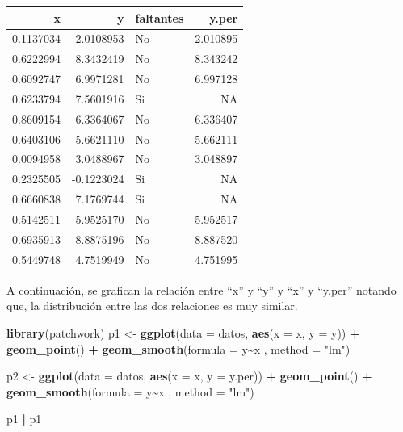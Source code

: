 \documentclass[
  spanish,
  12pt,
]{book}
\newenvironment{Shaded}{\begin{snugshade}}{\end{snugshade}}
\newcommand{\AttributeTok}[1]{\textcolor[rgb]{0.13,0.29,0.53}{#1}}
\newcommand{\FunctionTok}[1]{\textcolor[rgb]{0.13,0.29,0.53}{\textbf{#1}}}
\newcommand{\NormalTok}[1]{#1}
\newcommand{\OtherTok}[1]{\textcolor[rgb]{0.56,0.35,0.01}{#1}}
\newcommand{\SpecialCharTok}[1]{\textcolor[rgb]{0.81,0.36,0.00}{\textbf{#1}}}
\newcommand{\StringTok}[1]{\textcolor[rgb]{0.31,0.60,0.02}{#1}}
\begin{document}
\begin{tabular}{r|r|l|r}
\hline
x & y & faltantes & y.per\\
\hline
0.1137034 & 2.0108953 & No & 2.010895\\
\hline
0.6222994 & 8.3432419 & No & 8.343242\\
\hline
0.6092747 & 6.9971281 & No & 6.997128\\
\hline
0.6233794 & 7.5601916 & Si & NA\\
\hline
0.8609154 & 6.3364067 & No & 6.336407\\
\hline
0.6403106 & 5.6621110 & No & 5.662111\\
\hline
0.0094958 & 3.0488967 & No & 3.048897\\
\hline
0.2325505 & -0.1223024 & Si & NA\\
\hline
0.6660838 & 7.1769744 & Si & NA\\
\hline
0.5142511 & 5.9525170 & No & 5.952517\\
\hline
0.6935913 & 8.8875196 & No & 8.887520\\
\hline
0.5449748 & 4.7519949 & No & 4.751995\\
\hline
\end{tabular}

A continuación, se grafican la relación entre ``x'' y ``y'' y ``x'' y ``y.per'' notando que, la distribución entre las dos relaciones es muy similar.

\begin{Shaded}
\begin{Highlighting}[]
\FunctionTok{library}\NormalTok{(patchwork)}
\NormalTok{p1 }\OtherTok{\textless{}{-}} \FunctionTok{ggplot}\NormalTok{(}\AttributeTok{data =}\NormalTok{ datos, }\FunctionTok{aes}\NormalTok{(}\AttributeTok{x =}\NormalTok{ x, }\AttributeTok{y =}\NormalTok{ y)) }\SpecialCharTok{+}
  \FunctionTok{geom\_point}\NormalTok{() }\SpecialCharTok{+} \FunctionTok{geom\_smooth}\NormalTok{(}\AttributeTok{formula =}\NormalTok{ y}\SpecialCharTok{\textasciitilde{}}\NormalTok{x , }\AttributeTok{method =} \StringTok{"lm"}\NormalTok{)}

\NormalTok{p2 }\OtherTok{\textless{}{-}} \FunctionTok{ggplot}\NormalTok{(}\AttributeTok{data =}\NormalTok{ datos, }\FunctionTok{aes}\NormalTok{(}\AttributeTok{x =}\NormalTok{ x, }\AttributeTok{y =}\NormalTok{ y.per)) }\SpecialCharTok{+}
  \FunctionTok{geom\_point}\NormalTok{() }\SpecialCharTok{+} \FunctionTok{geom\_smooth}\NormalTok{(}\AttributeTok{formula =}\NormalTok{ y}\SpecialCharTok{\textasciitilde{}}\NormalTok{x , }\AttributeTok{method =} \StringTok{"lm"}\NormalTok{)}
  
\NormalTok{p1 }\SpecialCharTok{|}\NormalTok{ p1}
\end{Highlighting}
\end{Shaded}
\end{document}
